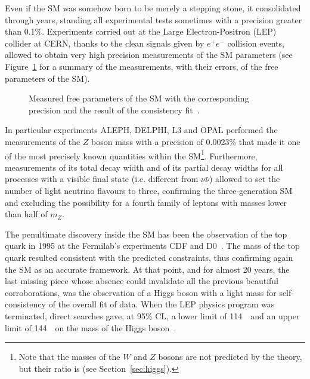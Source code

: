 Even if the SM was somehow born to be merely a stepping stone, 
it consolidated through years, standing all experimental tests 
sometimes with a precision greater than 0.1\%. Experiments carried 
out at the Large Electron-Positron (LEP) collider at CERN, 
thanks to the clean signals given by $e^{+}e^{-}$ collision events, 
allowed to obtain very high precision measurements of the SM parameters
(see Figure~\ref{fig:smparam} for a summary of the measurements, with
their errors, of the free parameters of the SM).
\begin{figure}[htb]\begin{center}
	\caption{Measured free parameters of the SM with the corresponding
          precision and the result of the consistency fit~\cite{Renton}.\label{fig:smparam}}
\end{center}\end{figure}
 
In particular experiments ALEPH, DELPHI, L3 and OPAL performed the measurements 
of the $Z$ boson mass with a precision of 0.0023\% that made it one of the most 
precisely known quantities within the SM\footnote{Note that the masses of the 
$W$ and $Z$ bosons are not predicted by the theory, but their ratio is (see 
Section~\ref{sec:higgs}).}. Furthermore, measurements of its total 
decay width and of its partial decay widths for all processes with a 
visible final state (i.e. different from $\nu\bar\nu$) allowed to set 
the number of light neutrino flavours to three, confirming the three-generation 
SM and excluding the possibility for a fourth family of leptons with masses lower 
than half of $m_Z$.

The penultimate discovery inside the SM has been the observation of the 
top quark in 1995 at the Fermilab's experiments CDF and D0~\cite{PhysRevLett.74.2626,PhysRevLett.74.2422}. 
The mass of the top quark resulted consistent with the predicted 
constraints, thus confirming again the SM as an accurate framework. 
At that point, and for almost 20 years, the last missing piece whose
absence could invalidate all the previous beautiful corroborations, was
the observation of a Higgs boson with a light mass for  self-consistency 
of the overall fit of data. When the LEP physics program was terminated,
direct searches gave, at 95\% CL, a lower limit of 114~\gev\ and an upper 
limit of 144~\gev\ on the mass of the Higgs boson~\cite{Renton}.


